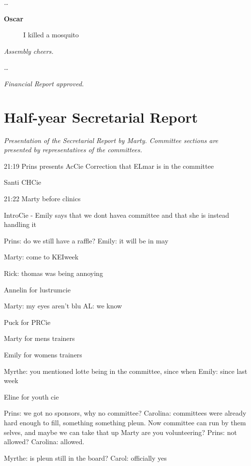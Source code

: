 \documentclass[12pt, a4paper]{article}
\newcommand{\speak}[2]{\begin{description}\item[\textbf{#1}]#2\end{description}}
\begin{document}


\dots

\speak{Oscar}{I killed a mosquito}

\textit{Assembly cheers.}


\dots

\textit{Financial Report approved.}



\section{Half-year Secretarial Report}

\textit{Presentation of the Secretarial Report by Marty. Committee sections are presented by representatives of the committees.}

21:19
Prins presents AcCie
Correction that ELmar is in the committee

Santi CHCie

21:22 Marty before clinics

IntroCie - Emily says that we dont havea committee and that she is instead handling it

Prins: do we still have a raffle?
Emily: it will be in may

Marty: come to KEIweek

Rick: thomas was being annoying

Annelin for lustrumcie

Marty: my eyes aren’t blu
AL: we know

Puck for PRCie\

Marty for mens trainers

Emily for womens trainers

Myrthe: you mentioned lotte being in the committee, since when
Emily: since last week

Eline for youth cie

Prins: we got no sponsors, why no committee?
Carolina: committees were already hard enough to fill, something something pleun. Now committee can run by them selves, and maybe we can take that up
Marty are you volunteering?
Prins: not allowed?
Carolina: allowed. 

Myrthe: is pleun still in the board?
Carol: officially yes
\end{document}
